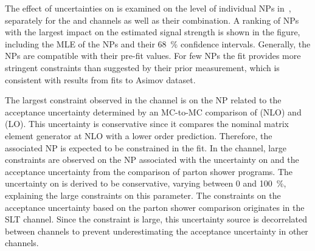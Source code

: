 The effect of uncertainties on \muhat is examined on the level of individual NPs
in~, separately for the \hadhad and \lephad
channels as well as their combination. A ranking of NPs with the largest impact
on the estimated signal strength is shown in the figure, including the MLE of
the NPs and their \SI{68}{\percent} confidence intervals. Generally, the NPs are
compatible with their pre-fit values. For few NPs the fit provides more
stringent constraints than suggested by their prior measurement, which is
consistent with results from fits to Asimov dataset.

The largest constraint observed in the \hadhad channel is on the NP related to
the \ZHF acceptance uncertainty determined by an MC-to-MC comparison of \SHERPA
(NLO) and \MGPY (LO). This uncertainty is conservative since it compares the
nominal matrix element generator at NLO with a lower order
prediction. Therefore, the associated NP is expected to be constrained in the
fit. In the \lephad channel, large constraints are observed on the NP associated
with the uncertainty on \rqcd and the \ttbar acceptance uncertainty from the
comparison of parton shower programs. The uncertainty on \rqcd is derived to be
conservative, varying \rqcd between 0 and \SI{100}{\percent}, explaining the
large constraints on this parameter.
The constraints on the \ttbar acceptance uncertainty based on the parton shower
comparison originates in the \lephad SLT channel. Since the constraint is large,
this uncertainty source is decorrelated between channels to prevent
underestimating the acceptance uncertainty in other channels.

